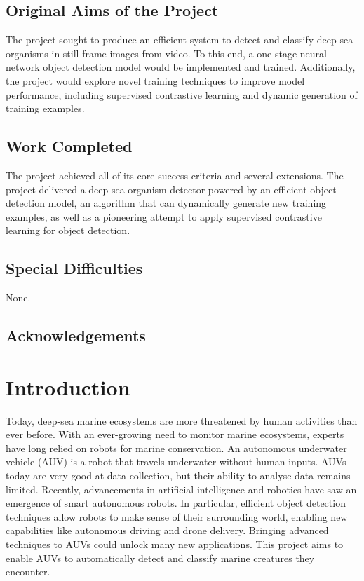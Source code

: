\documentclass[12pt,a4paper,twoside,openany]{report}
\begin{document}
\section*{Original Aims of the Project}
The project sought to produce an efficient system to detect and classify deep-sea organisms in still-frame images from video. To this end, a one-stage neural network object detection model would be implemented and trained. Additionally, the project would explore novel training techniques to improve model performance, including supervised contrastive learning and dynamic generation of training examples.

\section*{Work Completed}
The project achieved all of its core success criteria and several extensions. The project delivered a deep-sea organism detector powered by an efficient object detection model, an algorithm that can dynamically generate new training examples, as well as a pioneering attempt to apply supervised contrastive learning for object detection.

\section*{Special Difficulties}
None.

\tableofcontents

\newpage
\section*{Acknowledgements}

\pagestyle{headings}

\chapter{Introduction}

Today, deep-sea marine ecosystems are more threatened by human activities than ever before. With an ever-growing need to monitor marine ecosystems, experts have long relied on robots for marine conservation.
An autonomous underwater vehicle (AUV) is a robot that travels underwater without human inputs. AUVs today are very good at data collection, but their ability to analyse data remains limited.  Recently, advancements in artificial intelligence and robotics have saw an emergence of smart autonomous robots. In particular, efficient object detection techniques allow robots to make sense of their surrounding world, enabling new capabilities like autonomous driving and drone delivery. Bringing advanced techniques to AUVs could unlock many new applications. This project aims to enable AUVs to automatically detect and classify marine creatures they encounter.
\end{document}
